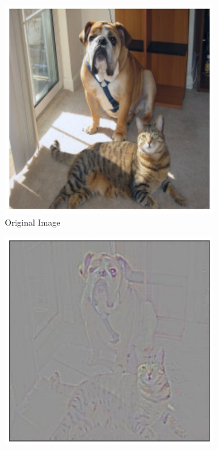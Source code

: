 \begin{figure}[t!]
	\centering
	\begin{subfigure}[t]{0.161\textwidth}
		\centering
		\includegraphics[width=\textwidth]{figures/teaser/original.jpg}
        \caption{\scriptsize{Original Image}}
	\end{subfigure}
	\begin{subfigure}[t]{0.161\textwidth}
		\centering
		\includegraphics[width=\textwidth]{figures/teaser/gb.jpg}

\end{subfigure}
\end{figure}
